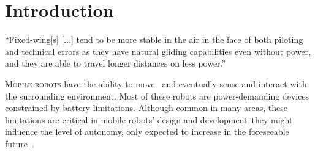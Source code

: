 
%
%
%
%
\chapter{Introduction}
\label{cp:intro}

\begin{chapquote}{\cite{wang2017curvature}}
  ``Fixed-wing[s] [...] tend to be more stable in the air in the face of both piloting and technical errors as they have natural gliding capabilities even without power, and they are able to travel longer distances on less power.''
\end{chapquote}

\vspace*{1em}

\lettrine{M}{obile robots} have the ability to move~\citep{corke2017robotics} and eventually sense and interact with the surrounding environment. Most of these robots are power-demanding devices constrained by battery limitations. Although common in many areas, these limitations are critical in mobile robots' design and development--they might influence the level of autonomy, only expected to increase in the foreseeable future~\citep{fisher2013verifying}.

